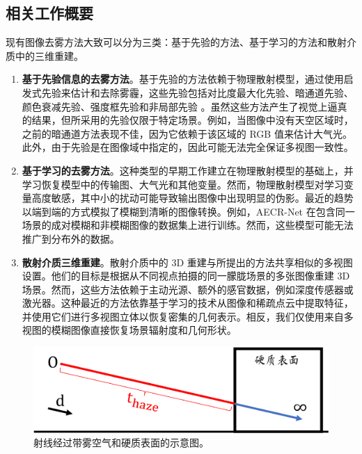 \subsection{相关工作概要}
现有图像去雾方法大致可以分为三类：基于先验的方法、基于学习的方法和散射介质中的三维重建。
\begin{enumerate}
    \item \textbf{基于先验信息的去雾方法}。基于先验的方法依赖于物理散射模型，通过使用启发式先验来估计和去除雾霾，这些先验包括对比度最大化先验、暗通道先验、颜色衰减先验、强度框先验和非局部先验 \cite{kaiming_he_single_2009, nishino_bayesian_2012, fattal_dehazing_2015, wu_contrastive_2021}。虽然这些方法产生了视觉上逼真的结果，但所采用的先验仅限于特定场景。例如，当图像中没有天空区域时，之前的暗通道方法表现不佳\cite{kaiming_he_single_2009}，因为它依赖于该区域的 RGB 值来估计大气光。此外，由于先验是在图像域中指定的，因此可能无法完全保证多视图一致性。
    \item \textbf{基于学习的去雾方法}。这种类型的早期工作\cite{cai_dehazenet_2016, fujimura_dehazing_2021, dong_multi-scale_2020, li_aod-net_2017, liu_griddehazenet_2019, qin_ffa-net_2020, qu_enhanced_2019, ren_gated_2018, ren_single_2020, zhang_densely_2018}建立在物理散射模型的基础上，并学习恢复模型中的传输图、大气光和其他变量。然而，物理散射模型对学习变量高度敏感，其中小的扰动可能导致输出图像中出现明显的伪影。最近的趋势\cite{song_vision_2022, liu_griddehazenet_2019, chen_gated_2019, deng_hardgan_2020, dong_multi-scale_2020, qin_ffa-net_2020, wu_contrastive_2021, wang_eaa-net_2021} 以端到端的方式模拟了模糊到清晰的图像转换。例如，AECR-Net \cite{wu_contrastive_2021} 在包含同一场景的成对模糊和非模糊图像的数据集上进行训练。然而，这些模型可能无法推广到分布外的数据。
    \item \textbf{散射介质三维重建}。散射介质中的 3D 重建与所提出的方法共享相似的多视图设置。他们的目标是根据从不同视点拍摄的同一朦胧场景的多张图像重建 3D 场景。然而，这些方法依赖于主动光源\cite{murez_photometric_2017, narasimhan_structured_2005, fujimura_photometric_2018, tsiotsios_backscatter_2014}、额外的感官数据，例如深度传感器或激光器\cite{caraffa_stereo_2013, li_simultaneous_2015, heide_imaging_2014, satat_towards_2018, wang_programmable_2018}。这种最近的方法\cite{fujimura_dehazing_2021, caraffa_stereo_2013, song_deep_2019, li_simultaneous_2015}依靠基于学习的技术从图像和稀疏点云中提取特征，并使用它们进行多视图立体以恢复密集的几何表示。相反，我们仅使用来自多视图的模糊图像直接恢复场景辐射度和几何形状。
\end{enumerate}

\begin{figure}[ht]
    \centering
    \includegraphics[width=\textwidth]{undergraduate-thesis/images/dehazing-nerf/t-haze.pdf}
    \caption{射线经过带雾空气和硬质表面的示意图。}
    \label{fig:dehazing-nerf t-haze decomposition}
\end{figure}


